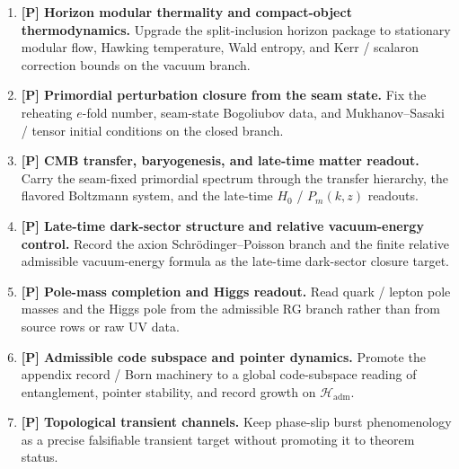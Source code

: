 \begin{tcolorbox}[colback=tfptblue!2, colframe=tfptblue!40, breakable,
    title={Extended downstream closure surface}, colbacktitle=tfptblue!60]
\begin{enumerate}[leftmargin=1.5em, topsep=3pt, itemsep=4pt]
    \item \textbf{[P] Horizon modular thermality and compact-object thermodynamics.} Upgrade the split-inclusion horizon package to stationary modular flow, Hawking temperature, Wald entropy, and Kerr / scalaron correction bounds on the vacuum branch.
    \item \textbf{[P] Primordial perturbation closure from the seam state.} Fix the reheating $e$-fold number, seam-state Bogoliubov data, and Mukhanov--Sasaki / tensor initial conditions on the closed branch.
    \item \textbf{[P] CMB transfer, baryogenesis, and late-time matter readout.} Carry the seam-fixed primordial spectrum through the transfer hierarchy, the flavored Boltzmann system, and the late-time $H_0$ / $P_m(k,z)$ readouts.
    \item \textbf{[P] Late-time dark-sector structure and relative vacuum-energy control.} Record the axion Schr\"odinger--Poisson branch and the finite relative admissible vacuum-energy formula as the late-time dark-sector closure target.
    \item \textbf{[P] Pole-mass completion and Higgs readout.} Read quark / lepton pole masses and the Higgs pole from the admissible RG branch rather than from source rows or raw UV data.
    \item \textbf{[P] Admissible code subspace and pointer dynamics.} Promote the appendix record / Born machinery to a global code-subspace reading of entanglement, pointer stability, and record growth on $\mathcal H_{\mathrm{adm}}$.
    \item \textbf{[P] Topological transient channels.} Keep phase-slip burst phenomenology as a precise falsifiable transient target without promoting it to theorem status.
\end{enumerate}
\end{tcolorbox}

